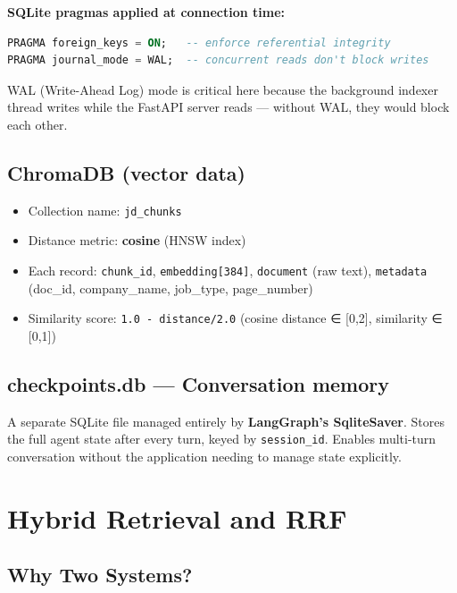\documentclass[12pt, a4paper]{article}
\begin{document}
\textbf{SQLite pragmas applied at connection time:}
\begin{lstlisting}[language=SQL]
PRAGMA foreign_keys = ON;   -- enforce referential integrity
PRAGMA journal_mode = WAL;  -- concurrent reads don't block writes
\end{lstlisting}

WAL (Write-Ahead Log) mode is critical here because the background indexer thread writes while the FastAPI server reads --- without WAL, they would block each other.

\subsection{ChromaDB (vector data)}

\begin{itemize}[noitemsep]
    \item Collection name: \texttt{jd\_chunks}
    \item Distance metric: \textbf{cosine} (HNSW index)
    \item Each record: \texttt{chunk\_id}, \texttt{embedding[384]}, \texttt{document} (raw text), \texttt{metadata} (doc\_id, company\_name, job\_type, page\_number)
    \item Similarity score: \texttt{1.0 - distance/2.0} (cosine distance ∈ [0,2], similarity ∈ [0,1])
\end{itemize}

\subsection{checkpoints.db --- Conversation memory}

A separate SQLite file managed entirely by \textbf{LangGraph's SqliteSaver}. Stores the full agent state after every turn, keyed by \texttt{session\_id}. Enables multi-turn conversation without the application needing to manage state explicitly.

\section{Hybrid Retrieval and RRF}

\subsection{Why Two Systems?}
\end{document}
